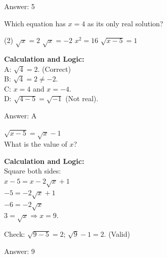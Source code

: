 \documentclass[11pt,paper=a4,answers]{exam}
\begin{document}
\begin{questions}
\begin{solution}
\vspace{25pt}

Answer: \colorbox{yellow!100}{5}
\end{solution}

\vspace{40pt}

\question
Which equation has $x = 4$ as its only real solution?
\begin{tasks}(2)
    \task $\sqrt{x} = 2$
    \task $\sqrt{x} = -2$
    \task $x^2 = 16$
    \task $\sqrt{x-5} = 1$
\end{tasks}

\begin{solution}
\textbf{Calculation and Logic:} \\
A: $\sqrt{4} = 2$. (Correct) \\
B: $\sqrt{4} = 2 \neq -2$. \\
C: $x = 4$ and $x = -4$. \\
D: $\sqrt{4-5} = \sqrt{-1}$ (Not real).

\vspace{25pt}

Answer: \colorbox{yellow!100}{A}
\end{solution}

\vspace{40pt}

\question
$\sqrt{x-5} = \sqrt{x} - 1$ \\
What is the value of $x$?

\begin{solution}
\textbf{Calculation and Logic:} \\
Square both sides: \\
$x - 5 = x - 2\sqrt{x} + 1$ \\
$-5 = -2\sqrt{x} + 1$ \\
$-6 = -2\sqrt{x}$ \\
$3 = \sqrt{x} \Rightarrow x = 9$.

\vspace{10pt}

Check: $\sqrt{9-5} = 2$; $\sqrt{9}-1 = 2$. (Valid)

\vspace{25pt}

Answer: \colorbox{yellow!100}{9}
\end{solution}

\vspace{40pt}


\end{questions}
\end{document}
